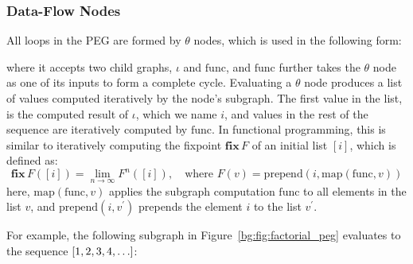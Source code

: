 \subsubsection{Data-Flow Nodes}

All loops in the PEG are formed by $\theta$ nodes, which is used in the
following form:
\begin{center}
    \vspace{-16.5pt}
    \vspace{-16.5pt}
\end{center}
where it accepts two child graphs, $\iota$ and $\mathrm{func}$, and
$\mathrm{func}$ further takes the $\theta$ node as one of its inputs to
form a complete cycle.  Evaluating a $\theta$ node produces a list of
values computed iteratively by the node's subgraph.  The first value in the
list, is the computed result of $\iota$, which we name $i$, and values in
the rest of the sequence are iteratively computed by $\mathrm{func}$.  In
functional programming, this is similar to iteratively computing the fixpoint
$\mathbf{fix}\,F$ of an initial list $[i]$, which is defined as:
\begin{equation}
    \mathbf{fix}\,F ([i]) = \lim_{n \to \infty} F^n ([i]),
    \quad\text{where~}
    F(v) = \mathrm{prepend}\left(
        i, \mathrm{map}\left( \mathrm{func}, v \right)
    \right)
\end{equation}
here, $\mathrm{map}(\mathrm{func}, v)$ applies the subgraph computation
$\mathrm{func}$ to all elements in the list $v$, and $\mathrm{prepend}(i,
v^\prime)$ prepends the element $i$ to the list $v^\prime$.

For example, the following subgraph in Figure~\ref{bg:fig:factorial_peg}
evaluates to the sequence $[1, 2, 3, 4, \mathellipsis]$:
\begin{center}
    \vspace{-16.5pt}
    \vspace{-16.5pt}
\end{center}

